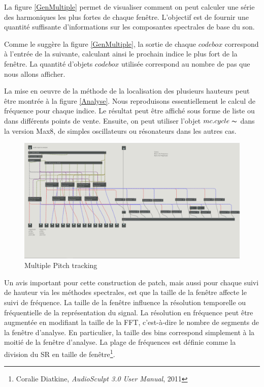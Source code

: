 La figure \ref{GenMultiple} permet de visualiser comment on peut calculer une série des harmoniques les plus fortes de chaque fenêtre. L'objectif est de fournir une quantité suffisante d'informations sur les composantes spectrales de base du son.

Comme le suggère la figure \ref{GenMultiple}, la sortie de chaque $ codebox $ correspond à l'entrée de la suivante, calculant ainsi le prochain indice le plus fort de la fenêtre. La quantité d’objets $ codebox $ utilisée correspond au nombre de pas que nous allons afficher.

La mise en oeuvre de la méthode de la localisation des plusieurs hauteurs peut être montrée à la figure \ref{Analyse}. Nous reproduisons essentiellement le calcul de fréquence pour chaque indice. Le résultat peut être affiché sous forme de liste ou dans différents points de vente. Ensuite, on peut utiliser l’objet $ mc.cycle \thicksim $ dans la version Max8, de simples oscillateurs ou résonateurs dans les autres cas.

    \begin{figure}
        \centering
        \includegraphics[width = \textwidth]{Graphs/MultipleTrack.png}
        \caption{Multiple Pitch tracking}
        \label{Analysis}
    \end{figure}

Un avis important pour cette construction de patch, mais aussi pour chaque suivi de hauteur via les méthodes spectrales, est que la taille de la fenêtre affecte le suivi de fréquence. La taille de la fenêtre influence la résolution temporelle ou fréquentielle de la représentation du signal. La résolution en fréquence peut être augmentée en modifiant la taille de la FFT, c'est-à-dire le nombre de segments de la fenêtre d'analyse. En particulier, la taille des bins correspond simplement à la moitié de la fenêtre d’analyse. La plage de fréquences est définie comme la division du SR en taille de fenêtre\footnote{Coralie Diatkine, \textit{AudioSculpt 3.0 User Manual}, 2011 \nocite{Audiosculpt}}.

